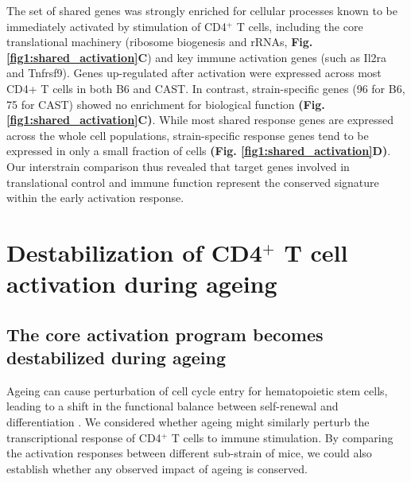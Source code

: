 The set of shared genes was strongly enriched for cellular processes known to be immediately activated by stimulation of CD4$^+$ T cells, including the core translational machinery (ribosome biogenesis and rRNAs, \textbf{Fig. \ref{fig1:shared_activation}C}) and key immune activation genes (such as Il2ra and Tnfrsf9)\citep{Asmal2003}. Genes up-regulated after activation were expressed across most CD4+ T cells in both B6 and CAST. In contrast, strain-specific genes (96 for B6, 75 for CAST) showed no enrichment for biological function \textbf{(Fig. \ref{fig1:shared_activation}C)}. While most shared response genes are expressed across the whole cell populations, strain-specific response genes tend to be expressed in only a small fraction of cells \textbf{(Fig. \ref{fig1:shared_activation}D)}. \\

Our interstrain comparison thus revealed that target genes involved in translational control and immune function represent the conserved signature within the early activation response.

\newpage

\section{Destabilization of CD4$^+$ T cell activation during ageing}
\subsection*{The core activation program becomes destabilized during ageing}

Ageing can cause perturbation of cell cycle entry for hematopoietic stem cells, leading to a shift in the functional balance between self-renewal and differentiation \citep{Kowalczyk2015}. We considered whether ageing might similarly perturb the transcriptional response of CD4$^+$ T cells to immune stimulation. By comparing the activation responses between different sub-strain of mice, we could also establish whether any observed impact of ageing is conserved.\\

